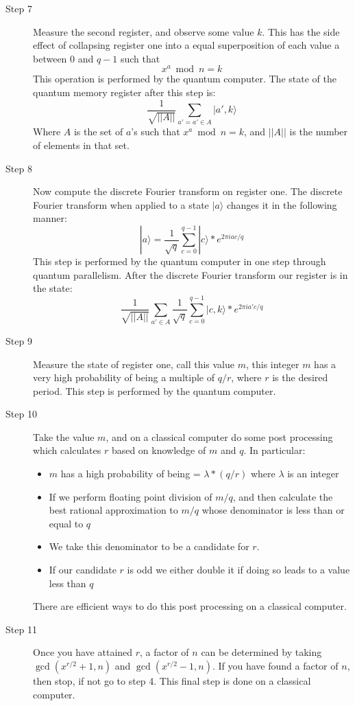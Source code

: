 \documentclass[]{article}
\begin{document}
\begin{description}
\item[Step 7] Measure the second register, and observe some value $k$.
  This has the side effect of collapsing register one into a equal
  superposition of each value a between 0 and $q-1$ such that
	\[x^{a} \bmod n = k\]
This operation is performed by the quantum computer. The state
of the quantum memory register after this step is:
	\[\frac{1}{\sqrt{||A||}}\sum_{a'=a'\in A}|a', k \rangle \] 
Where $A$ is the set of $a$'s such that $x^{a} \bmod n = k$,
and $||A||$ is the number of elements in that set.

\item[Step 8] Now compute the discrete Fourier transform on register
  one. The discrete Fourier transform when applied to a state $|a
  \rangle $ changes it in the following manner:
	\[|a \rangle = \frac{1}{\sqrt{q}}\sum_{c=0}^{q-1}|c \rangle *e^{2\pi iac/q}\]
This step is performed by the quantum computer in one step
through quantum parallelism.  After the discrete Fourier transform our
register is in the state:
	\[\frac{1}{\sqrt{||A||}}\sum_{a'\in A}\frac{1}{\sqrt{q}}\sum_{c=0}^{q-1} |c,k \rangle *e^{2\pi ia'c/q}\]

\item[Step 9] Measure the state of register one, call this value $m$,
  this integer $m$ has a very high probability of being a multiple of
  $q/r$, where $r$ is the desired period.  This step is performed by
  the quantum computer.

\item[Step 10] Take the value $m$, and on a classical computer do some
  post processing which calculates $r$ based on knowledge of $m$ and
  $q$.  In particular:
  \begin{itemize}
    \item $m$ has a high probability of being = $\lambda * (q / r)$ where $\lambda$ is an integer
    \item If we perform floating point division of $m / q$, and then calculate the best rational approximation to $m / q$ whose denominator is less than or equal to $q$
    \item We take this denominator to be a candidate for $r$.
    \item If our candidate $r$ is odd we either double it if doing so leads to a value less than $q$
  \end{itemize}
  There are efficient ways to do this post processing on a classical
  computer.

\item[Step 11] Once you have attained $r$, a factor of $n$ can be
  determined by taking $\gcd(x^{r/2} + 1, n)$ and $\gcd(x^{r/2} - 1, n)$.  
  If you have found a factor of $n$, then stop, if not go to
  step 4.  This final step is done on a classical computer.

\end{description}
\end{document}
